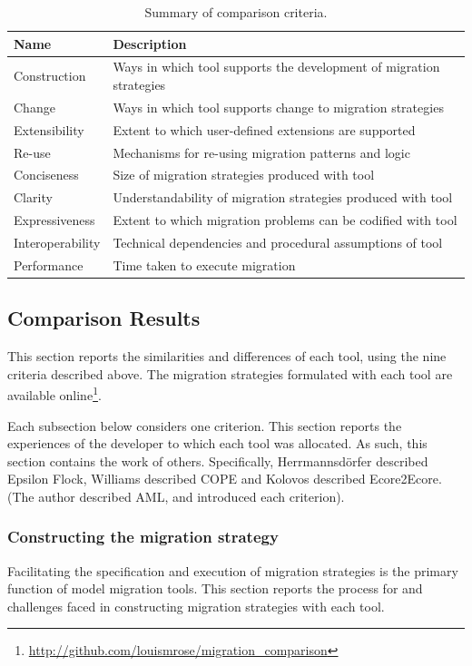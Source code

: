 \begin{table}[hbtp]
	\centering
	\begin{tabular}{|p{3cm}|p{9cm}|}
	\hline
	\textbf{Name}    & \textbf{Description} \\
	\hline
	Construction     & Ways in which tool supports the development of migration strategies \\
	\hline
	Change           & Ways in which tool supports change to migration strategies \\
	\hline
	Extensibility    & Extent to which user-defined extensions are supported \\
	\hline
	Re-use           & Mechanisms for re-using migration patterns and logic \\
	\hline
	Conciseness      & Size of migration strategies produced with tool \\
	\hline
	Clarity          & Understandability of migration strategies produced with tool \\
	\hline
	Expressiveness   & Extent to which migration problems can be codified with tool \\
	\hline
	Interoperability & Technical dependencies and procedural assumptions of tool \\
	\hline
	Performance      & Time taken to execute migration \\
	\hline
	\end{tabular}
	\label{tab:criteria}
	\caption{Summary of comparison criteria.}
\end{table}


\subsection{Comparison Results}
\label{sec:results}
This section reports the similarities and differences of each tool, using the nine criteria described above. The migration strategies formulated with each tool are available online\footnote{\url{http://github.com/louismrose/migration_comparison}}. 

Each subsection below considers one criterion. This section reports the experiences of the developer to which each tool was allocated. As such, this section contains the work of others. Specifically, Herrmannsd\"{o}rfer described Epsilon Flock, Williams described COPE and Kolovos described Ecore2Ecore. (The author described AML, and introduced each criterion). 

\subsubsection{Constructing the migration strategy}
\label{subsec:constructing}
Facilitating the specification and execution of migration strategies is the primary function of model migration tools. This section reports the process for and challenges faced in constructing migration strategies with each tool.

